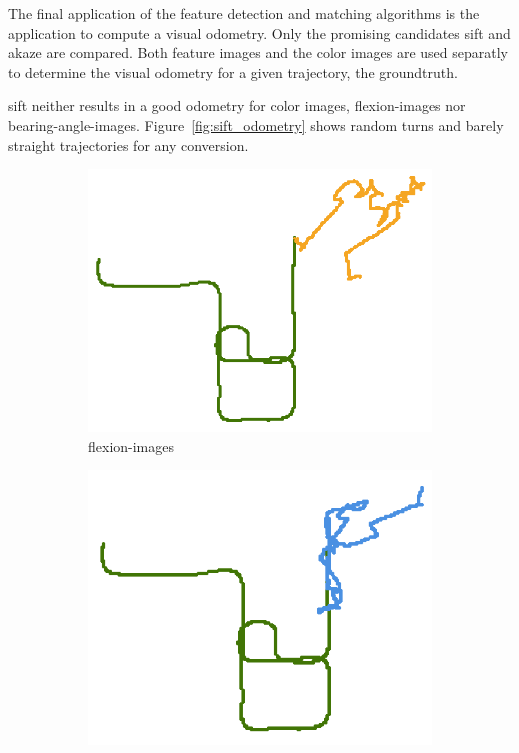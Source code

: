 The final application of the feature detection and matching algorithms is the application to compute a visual odometry. 
Only the promising candidates \acrshort{sift} and \acrshort{akaze} are compared.
Both feature images and the color images are used separatly to determine the visual odometry for a given trajectory, the groundtruth.

\acrshort{sift} neither results in a good odometry for color images, \glspl{flexion-image} nor \glspl{bearing-angle-image}.
Figure~\ref{fig:sift_odometry} shows random turns and barely straight trajectories for any conversion.
\begin{figure}[htp]
\begin{subfigure}[c]{0.31\linewidth}
    \includegraphics[width=\linewidth]{chapter06/odo/jonas_flexion_SIFT_nice.png}%
    \caption{\glspl{flexion-image}}
\end{subfigure}%
\begin{subfigure}[c]{0.31\linewidth}
    \includegraphics[width=\linewidth]{chapter06/odo/jonas_bearing_SIFT_nice.png}%

\end{subfigure}
\end{figure}
